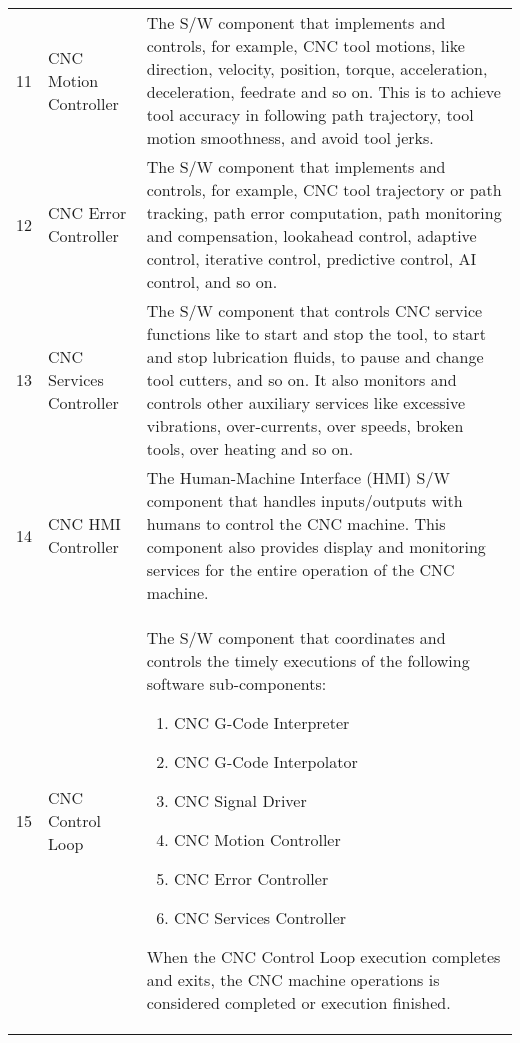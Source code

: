 
\begin{table}[ht]
	\begin{center}
		\begin{tabular}{ |p{0.5cm}|p{3.4cm}|p{12.0cm}| }
			\rowcolor{LIGHTCYAN}			
			\hline \multicolumn{3}{|c|}{\textbf{CNC Terminology Part 2 of 2}} \\ [1.0ex]

			
			\hline 11 & CNC Motion Controller & The S/W component that implements and controls, for example, CNC tool motions, like direction, velocity, position, torque, acceleration, deceleration, feedrate and so on. This is to achieve tool accuracy in following path trajectory, tool motion smoothness, and avoid tool jerks.\\
			
			\hline 12 & CNC Error Controller & The S/W component that implements and controls, for example, CNC tool trajectory or path tracking, path error computation, path monitoring and compensation, lookahead control, adaptive control, iterative control, predictive control, AI control, and so on.\\
			
			\hline 13 & CNC Services Controller & The S/W component that controls CNC service functions like to start and stop the tool, to start and stop lubrication fluids, to pause and change tool cutters, and so on. It also monitors and controls other auxiliary services like excessive vibrations, over-currents, over speeds, broken tools, over heating and so on. \\
			
			\hline 14 & CNC HMI Controller & The Human-Machine Interface (HMI) S/W component that handles inputs/outputs with humans to control the CNC machine. This component also provides display and monitoring services for the entire operation of the CNC machine.\\
			
			\hline 15 & CNC Control Loop & The S/W component that coordinates and controls the timely executions of the following software sub-components:
			
			\begin{enumerate}
				\item CNC G-Code Interpreter
				\item CNC G-Code Interpolator
				\item CNC Signal Driver
				\item CNC Motion Controller
				\item CNC Error Controller
				\item CNC Services Controller
			\end{enumerate} 
			When the CNC Control Loop execution completes and exits, the CNC machine operations is considered completed or execution finished. \\
			

\end{tabular}
\end{center}
\end{table}
